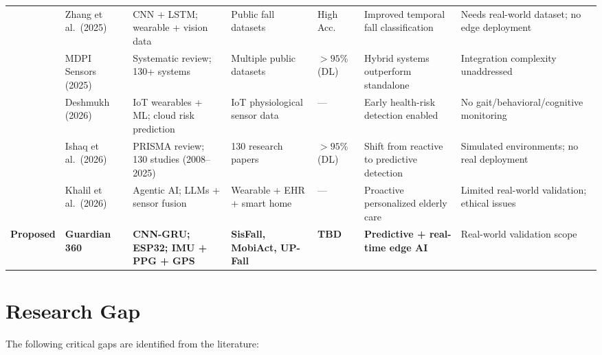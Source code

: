 \documentclass[conference]{IEEEtran}
\begin{document}
\begin{table}[!t]
\begin{tabular}{C{0.55cm} L{1.6cm} L{2.2cm} L{1.8cm} C{1.0cm} L{2.5cm} L{2.5cm}}
\cite{zhang2025}        & Zhang et al.\ (2025)        & CNN + LSTM; wearable + vision data                    & Public fall datasets          & High Acc.         & Improved temporal fall classification              & Needs real-world dataset; no edge deployment           \\
\cite{mdpisensors2025}  & MDPI Sensors (2025)         & Systematic review; 130+ systems                       & Multiple public datasets      & ${>}95\%$ (DL)    & Hybrid systems outperform standalone               & Integration complexity unaddressed                     \\
\cite{deshmukh2026}     & Deshmukh (2026)             & IoT wearables + ML; cloud risk prediction             & IoT physiological sensor data & ---               & Early health-risk detection enabled                & No gait/behavioral/cognitive monitoring                \\
\cite{ishaq2026}        & Ishaq et al.\ (2026)        & PRISMA review; 130 studies (2008--2025)               & 130 research papers           & ${>}95\%$ (DL)    & Shift from reactive to predictive detection        & Simulated environments; no real deployment             \\
\cite{khalil2026}       & Khalil et al.\ (2026)       & Agentic AI; LLMs + sensor fusion                      & Wearable + EHR + smart home   & ---               & Proactive personalized elderly care                & Limited real-world validation; ethical issues          \\
\midrule
\textbf{Proposed}       & \textbf{Guardian 360}       & \textbf{CNN-GRU; ESP32; IMU + PPG + GPS}              & \textbf{SisFall, MobiAct, UP-Fall} & \textbf{TBD} & \textbf{Predictive + real-time edge AI}        & Real-world validation scope                            \\
\bottomrule
\end{tabular}
\end{table}

\section{Research Gap}
\label{sec:gap}

The following critical gaps are identified from the literature:
\end{document}
